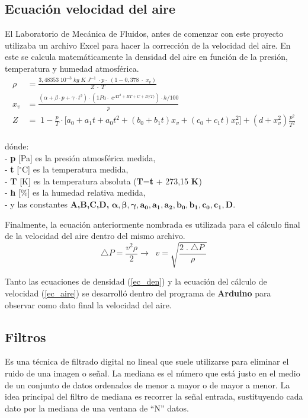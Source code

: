 \subsection{Ecuación velocidad del aire}
El Laboratorio de Mecánica de Fluidos, antes de comenzar con este proyecto utilizaba un archivo Excel para hacer la corrección de la velocidad del aire. En este se calcula matemáticamente la densidad del aire en función de la presión, temperatura y humedad atmosférica.
\begin{align}
	\rho&=\frac{3,48353\;10^{-3}\;kg\;K\;J^{-1}\;\cdot p\cdot\;(1-0,378\;\cdot\;x_v)}{Z\;\cdot\;T} \label{ec_den}\\
	x_v&=\frac{(\alpha+\beta\cdot p+\gamma\cdot t^2)\cdot(1Pa\cdot\;e^{AT^2+BT+C+D/T)})\cdot h/100}p\\
	Z&=\;1-\frac pT\cdot\lbrack a_0+a_1t+a_0t^2+(b_0+b_1t)x_v+(c_0+c_1t)x_v^2\rbrack+(d+x_v^2)\frac{p^2}{T^2}
\end{align}
\\
dónde:\\
- \textbf{p } [Pa] es la presión atmosférica medida,\\
- \textbf{t } [$^{\circ}$C] es la temperatura medida,\\
- \textbf{T } [K] es la temperatura absoluta (\textbf{T}=\textbf{t} + 273,15 \textbf{K})\\
- \textbf{h } [\%] es la humedad relativa medida,\\
- y las constantes \textbf{A,B,C,D,} $\boldsymbol{\alpha , \beta  , \gamma , a_0, a_1 ,a_2 ,b_0  ,b_1 , c_0 , c_1, D. }$


Finalmente, la ecuación anteriormente nombrada es utilizada para el cálculo final de la velocidad del aire dentro del mismo archivo.
\begin{equation}
	\triangle P=\frac{v^2\rho}2\rightarrow\;\;v=\sqrt{\frac{2\;.\;\triangle P\;}\rho}
	\label{ec_aire}
\end{equation}

Tanto las ecuaciones de densidad (\ref{ec_den})
 y la ecuación del cálculo de velocidad  (\ref{ec_aire})
  se desarrolló dentro del programa de \textbf{Arduino} para observar como dato final la velocidad del aire.


\subsection{Filtros}
\begin{tcolorbox}[colback=blue!5!white,colframe=blue!75!black,title=Mediana]
	Es una técnica de filtrado digital no lineal que suele utilizarse para eliminar el ruido de una imagen o señal. La mediana es el número que está justo en el medio de un conjunto de datos ordenados de menor a mayor o de mayor a menor.
	La idea principal del filtro de mediana es recorrer la señal entrada, sustituyendo cada dato por la mediana de una ventana de “N” datos.
\end{tcolorbox}

